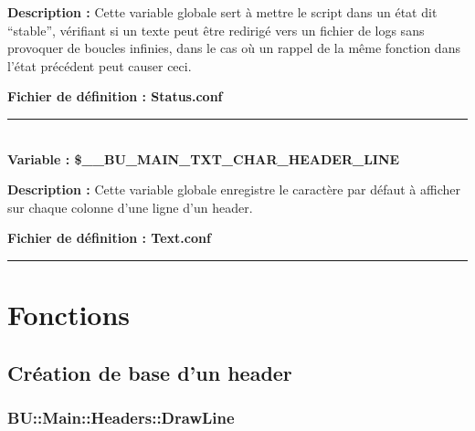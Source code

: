 \documentclass[a4paper,10pt]{article}
\begin{document}
\begin{justify}
    \textbf{Description :} Cette variable globale sert à mettre le script dans un état dit ``stable'', vérifiant si un texte peut être redirigé vers un fichier de logs sans provoquer de boucles infinies, dans le cas où un rappel de la même fonction dans l'état précédent peut causer ceci.
\end{justify}

\textbf{Fichier de définition : \color{lime}Status.conf}\\[1\baselineskip]



\color{orange}\par\noindent\rule{\textwidth}{0.4pt}\color{white}\\[1\baselineskip]

\textbf{Variable : \color{orange}\$\_\_BU\_MAIN\_TXT\_CHAR\_HEADER\_LINE}\\[1\baselineskip]

\begin{justify}
    \textbf{Description :} Cette variable globale enregistre le caractère par défaut à afficher sur chaque colonne d'une ligne d'un header.
\end{justify}

\textbf{Fichier de définition : \color{lime}Text.conf}\\[1\baselineskip]





\color{red}\par\noindent\rule{\textwidth}{0.4pt}\color{white}

\color{red}
\section{Fonctions}\color{white}

\color{green}
\subsection{Création de base d'un header}\color{white}

\color{blue}
\subsubsection{BU::Main::Headers::DrawLine}\color{white}
\end{document}
